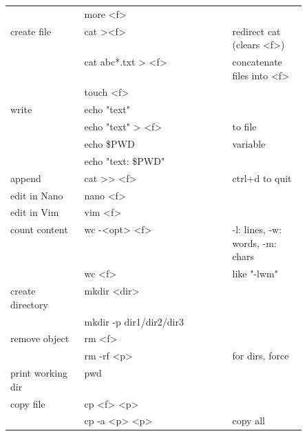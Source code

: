 {\begin{tabularx}{\linewidth}{@{} p{0.25\linewidth}>{\ttfamily}lp{0.25\linewidth} @{}}
                             & more <f>                   &                                  \\
        create file          & cat ><f>                   & redirect cat (clears <f>)        \\
                             & cat abc*.txt > <f>         & concatenate files into <f>       \\
                             & touch <f>                  &                                  \\
        write                & echo "text"                &                                  \\
                             & echo "text" > <f>          & to file                          \\
                             & echo \$PWD                 & variable                         \\
                             & echo "text: \$PWD"         &                                  \\
        append               & cat >> <f>                 & ctrl+d to quit                   \\
        edit in Nano         & nano <f>                   &                                  \\
        edit in Vim          & vim <f>                    &                                  \\
        count content        & wc -<opt> <f>              & -l: lines, -w: words, -m: chars  \\
                             & wc <f>                     & like "-lwm"                      \\
        create directory     & mkdir <dir>                &                                  \\
                             & mkdir -p dir1/dir2/dir3    &                                  \\
        remove object        & rm <f>                     &                                  \\
                             & rm -rf <p>                 & for dirs, force                  \\
        print working dir    & pwd                        &                                  \\
        copy file            & cp <f> <p>                 &                                  \\
                             & cp -a <p> <p>              & copy all                         \\

\end{tabularx}}
